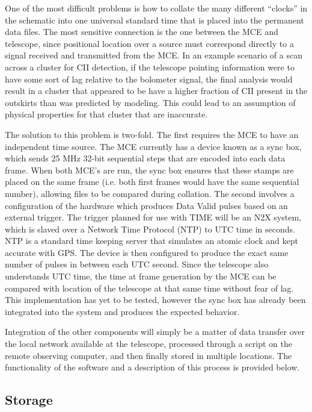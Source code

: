 \documentclass[manuscript]{aastex}
\begin{document}
 One of the most difficult problems is how to collate the many different ``clocks'' in the schematic into one universal standard time that is placed into the permanent data files. The most sensitive connection is the one between the MCE and telescope, since positional location over a source must correspond directly to a signal received and transmitted from the MCE. In an example scenario of a scan across a cluster for CII detection, if the telescope pointing information were to have some sort of lag relative to the bolometer signal, the final analysis would result in a cluster that appeared to be have a higher fraction of CII present in the outskirts than was predicted by modeling. This could lead to an assumption of physical properties for that cluster that are inaccurate. 
 
The solution to this problem is two-fold. The first requires the MCE to have an independent time source. The MCE currently has a device known as a sync box, which sends 25 MHz 32-bit sequential steps that are encoded into each data frame. When both MCE's are run, the sync box ensures that these stamps are placed on the same frame (i.e. both first frames would have the same sequential number), allowing files to be compared during collation. The second involves a configuration of the hardware which produces Data Valid pulses based on an external trigger. The trigger planned for use with TIME will be an N2X system, which is slaved over a Network Time Protocol (NTP) to UTC time in seconds. NTP is a standard time keeping server that simulates an atomic clock and kept accurate with GPS. The device is then configured to produce the exact same number of pulses in between each UTC second. Since the telescope also understands UTC time, the time at frame generation by the MCE can be compared with location of the telescope at that same time without fear of lag. This implementation has yet to be tested, however the sync box has already been integrated into the system and produces the expected behavior. 

Integration of the other components will simply be a matter of data transfer over the local network available at the telescope, processed through a script on the remote observing computer, and then finally stored in multiple locations. The functionality of the software and a description of this process is provided below. 

\subsection{Storage}
\end{document}
